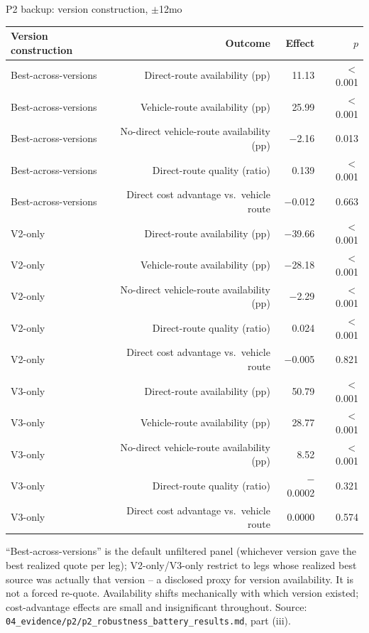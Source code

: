 \documentclass[aspectratio=169]{beamer}
\begin{document}
\begin{frame}{P2 backup: version construction, $\pm$12mo}
  \tiny
  \begin{center}
  \begin{tabular}{@{}l r r r@{}}
    \toprule
    Version construction & Outcome & Effect & $p$ \\
    \midrule
    Best-across-versions & Direct-route availability (pp) & 11.13 & $<$0.001 \\
    Best-across-versions & Vehicle-route availability (pp) & 25.99 & $<$0.001 \\
    Best-across-versions & No-direct vehicle-route availability (pp) & $-$2.16 & 0.013 \\
    Best-across-versions & Direct-route quality (ratio) & 0.139 & $<$0.001 \\
    Best-across-versions & Direct cost advantage vs.\ vehicle route & $-$0.012 & 0.663 \\
    V2-only & Direct-route availability (pp) & $-$39.66 & $<$0.001 \\
    V2-only & Vehicle-route availability (pp) & $-$28.18 & $<$0.001 \\
    V2-only & No-direct vehicle-route availability (pp) & $-$2.29 & $<$0.001 \\
    V2-only & Direct-route quality (ratio) & 0.024 & $<$0.001 \\
    V2-only & Direct cost advantage vs.\ vehicle route & $-$0.005 & 0.821 \\
    V3-only & Direct-route availability (pp) & 50.79 & $<$0.001 \\
    V3-only & Vehicle-route availability (pp) & 28.77 & $<$0.001 \\
    V3-only & No-direct vehicle-route availability (pp) & 8.52 & $<$0.001 \\
    V3-only & Direct-route quality (ratio) & $-$0.0002 & 0.321 \\
    V3-only & Direct cost advantage vs.\ vehicle route & 0.0000 & 0.574 \\
    \bottomrule
  \end{tabular}
  \end{center}
  \vspace{0.3em}
  \tiny ``Best-across-versions'' is the default unfiltered panel (whichever version gave the best realized quote per leg); V2-only/V3-only restrict to legs whose realized best source was actually that version -- a disclosed proxy for version availability. It is not a forced re-quote. Availability shifts mechanically with which version existed; cost-advantage effects are small and insignificant throughout. Source: \texttt{04\_evidence/p2/p2\_robustness\_battery\_results.md}, part (iii).
\end{frame}
\end{document}
